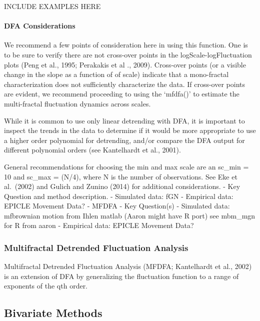 \documentclass[
  english,
  man]{apa6}
\let\oldparagraph\paragraph
\renewcommand{\paragraph}[1]{\oldparagraph{#1}\mbox{}}
\begin{document}
INCLUDE EXAMPLES HERE

\hypertarget{dfa-considerations}{%
\paragraph{DFA Considerations}\label{dfa-considerations}}

We recommend a few points of consideration here in using this function.
One is to be sure to verify there are not cross-over points in the
logScale-logFluctuation plots (Peng et al., 1995; Perakakis et al .,
2009). Cross-over points (or a visible change in the slope as a function
of of scale) indicate that a mono-fractal characterization does not
sufficiently characterize the data. If cross-over points are evident, we
recommend proceeding to using the `mfdfa()' to estimate the
multi-fractal fluctuation dynamics across scales.

While it is common to use only linear detrending with DFA, it is
important to inspect the trends in the data to determine if it would be
more appropriate to use a higher order polynomial for detrending, and/or
compare the DFA output for different polynomial orders (see Kantelhardt
et al., 2001).

General recommendations for choosing the min and max scale are an sc\_min
= 10 and sc\_max = (N/4), where N is the number of observations. See Eke
et al.~(2002) and Gulich and Zunino (2014) for additional
considerations. - Key Question and method description. - Simulated data:
fGN - Empirical data: EPICLE Movement Data? - MFDFA - Key Question(s) -
Simulated data: mfbrownian motion from Ihlen matlab (Aaron might have R
port) see mbm\_mgn for R from aaron - Empirical data: EPICLE Movement
Data?

\hypertarget{multifractal-detrended-fluctuation-analysis}{%
\subsubsection{Multifractal Detrended Fluctuation Analysis}\label{multifractal-detrended-fluctuation-analysis}}

Multifractal Detrended Fluctuation Analysis (MFDFA; Kantelhardt et al.,
2002) is an extension of DFA by generalizing the fluctuation function to
a range of exponents of the qth order.

\hypertarget{bivariate-methods}{%
\subsection{Bivariate Methods}\label{bivariate-methods}}
\end{document}
